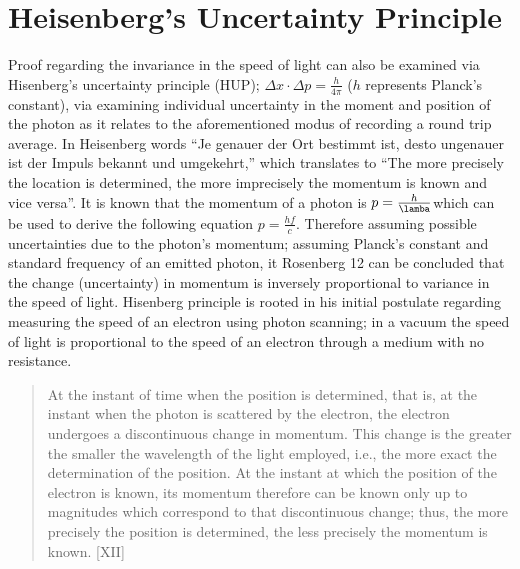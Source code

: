\documentclass[12pt,letterpaper]{article}
\begin{document}
\section{Heisenberg’s Uncertainty Principle}
Proof regarding the invariance in the speed of light can also be examined via Hisenberg's
uncertainty principle (HUP); $\Delta x \cdot \Delta p =\frac{h}{4\pi}$ ($h$ represents Planck's constant), via examining individual uncertainty in the moment and position of the photon as it relates to the aforementioned modus of recording a round trip average. In Heisenberg words “Je genauer der Ort bestimmt ist, desto ungenauer ist der Impuls bekannt und umgekehrt,” which translates to “The more precisely the location is determined, the more imprecisely the momentum is known and vice versa”. It is known that the momentum of a photon is $p=\frac{h}{\lamba}$which can be used to derive the following equation $p=\frac{hf}{c}$. Therefore assuming possible uncertainties due to the photon's momentum; assuming Planck's constant and standard frequency of an emitted photon, it Rosenberg 12 can be concluded that the change (uncertainty) in momentum is inversely proportional to variance in the speed of light. Hisenberg principle is rooted in his initial postulate regarding measuring the speed of an electron using photon scanning; in a vacuum the speed of light is proportional to the speed of an electron through a medium with no resistance. 
\begin{quote}
    At the instant of time when the position is determined, that is, at the instant when the photon is scattered by the electron, the electron undergoes a discontinuous change in momentum. This change is the greater the smaller the wavelength of the light employed, i.e., the more exact the determination of the position. At the instant at which the position of the electron is known, its momentum therefore can be known only up to magnitudes which correspond to that discontinuous change; thus, the more precisely the position is determined, the less precisely the momentum is known. [XII]
\end{quote}
\end{document}
